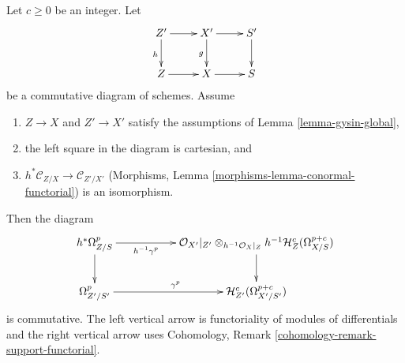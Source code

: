 \begin{lemma}
\label{lemma-gysin-transverse}
Let $c \geq 0$ be an integer. Let
$$
\xymatrix{
Z' \ar[d]_h \ar[r] & X' \ar[d]_g \ar[r] & S' \ar[d] \\
Z \ar[r] & X \ar[r] & S
}
$$
be a commutative diagram of schemes.
Assume
\begin{enumerate}
\item $Z \to X$ and $Z' \to X'$
satisfy the assumptions of Lemma \ref{lemma-gysin-global},
\item the left square in the diagram is cartesian, and
\item $h^*\mathcal{C}_{Z/X} \to \mathcal{C}_{Z'/X'}$
(Morphisms, Lemma \ref{morphisms-lemma-conormal-functorial})
is an isomorphism.
\end{enumerate}
Then the diagram
$$
\xymatrix{
h^*\Omega^p_{Z/S} \ar[rr]_-{h^{-1}\gamma^p} \ar[d] & &
\mathcal{O}_{X'}|_{Z'} \otimes_{h^{-1}\mathcal{O}_X|_Z}
h^{-1}\mathcal{H}^c_Z(\Omega^{p + c}_{X/S}) \ar[d] \\
\Omega^p_{Z'/S'} \ar[rr]^{\gamma^p} & &
\mathcal{H}^c_{Z'}(\Omega^{p + c}_{X'/S'})
}
$$
is commutative. The left vertical arrow is functoriality of modules of
differentials and the right vertical arrow uses
Cohomology, Remark \ref{cohomology-remark-support-functorial}.
\end{lemma}

